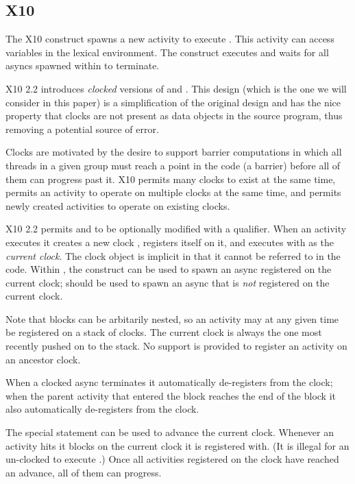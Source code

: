 \subsection{X10}

The X10 construct  spawns a new activity to execute
. This activity can access variables in the lexical
environment. The construct  executes  and waits
for all asyncs spawned within  to terminate. 

X10 2.2 introduces {\em clocked} versions of  and
. This design (which is the one we will consider in this
paper) is a simplification of the original design and has the nice
property that clocks are not present as data objects in the source
program, thus removing a potential source of error. 

Clocks are motivated by the desire to support barrier computations in
which all threads in a given group must reach a point in the code (a
barrier) before all of them can progress past it. X10 permits many
clocks to exist at the same time, permits an activity to operate on
multiple clocks at the same time, and permits newly created activities
to operate on existing clocks.
 
X10 2.2 permits  and  to be optionally
modified with a  qualifier.  When an activity executes
 it creates a new clock , registers
itself on it, and executes  with  as the {\em
  current clock}.  The clock object is implicit in that it cannot be
referred to in the code.  Within , the 
construct can be used to spawn an async registered on the current
clock;  should be used to spawn an async that is {\em
  not} registered on the current clock.

Note that  blocks can be arbitarily nested, so an
activity may at any given time be registered on a stack of clocks. The
current clock is always the one most recently pushed on to the stack. 
No support is provided to register an activity on an ancestor
clock. 

When a clocked async terminates it automatically de-registers from the
clock; when the parent activity that entered the 
block reaches the end of the block it also automatically de-registers
from the clock. 

The special statement  can be used to advance the
current clock.  Whenever an activity hits  it blocks on
the current clock it is registered with. (It is illegal for an
un-clocked  to execute .) Once all
activities registered on the clock have reached an advance, all of
them can progress. 

